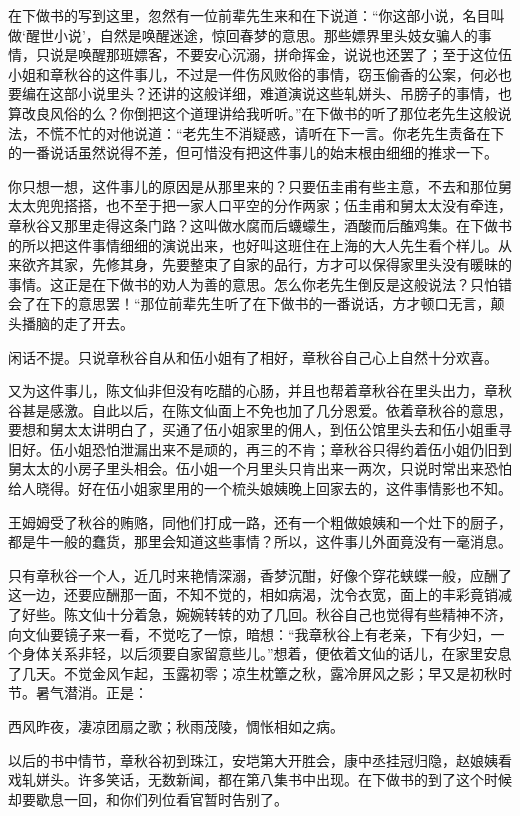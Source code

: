 \documentclass[12pt,UTF8]{ctexbook}
\begin{document}
{{{在下做书的写到这里，忽然有一位前辈先生来和在下说道：“你这部小说，名目叫做‘醒世小说’，自然是唤醒迷途，惊回春梦的意思。那些嫖界里头妓女骗人的事情，只说是唤醒那班嫖客，不要安心沉溺，拼命挥金，说说也还罢了；至于这位伍小姐和章秋谷的这件事儿，不过是一件伤风败俗的事情，窃玉偷香的公案，何必也要编在这部小说里头？还讲的这般详细，难道演说这些轧姘头、吊膀子的事情，也算改良风俗的么？你倒把这个道理讲给我听听。”在下做书的听了那位老先生这般说法，不慌不忙的对他说道：“老先生不消疑惑，请听在下一言。你老先生责备在下的一番说话虽然说得不差，但可惜没有把这件事儿的始末根由细细的推求一下。

你只想一想，这件事儿的原因是从那里来的？只要伍圭甫有些主意，不去和那位舅太太兜兜搭搭，也不至于把一家人口平空的分作两家；伍圭甫和舅太太没有牵连，章秋谷又那里走得这条门路？这叫做水腐而后蠛蠓生，酒酸而后醢鸡集。在下做书的所以把这件事情细细的演说出来，也好叫这班住在上海的大人先生看个样儿。从来欲齐其家，先修其身，先要整束了自家的品行，方才可以保得家里头没有暖昧的事情。这正是在下做书的劝人为善的意思。怎么你老先生倒反是这般说法？只怕错会了在下的意思罢！“那位前辈先生听了在下做书的一番说话，方才顿口无言，颠头播脑的走了开去。

闲话不提。只说章秋谷自从和伍小姐有了相好，章秋谷自己心上自然十分欢喜。

又为这件事儿，陈文仙非但没有吃醋的心肠，并且也帮着章秋谷在里头出力，章秋谷甚是感激。自此以后，在陈文仙面上不免也加了几分恩爱。依着章秋谷的意思，要想和舅太太讲明白了，买通了伍小姐家里的佣人，到伍公馆里头去和伍小姐重寻旧好。伍小姐恐怕泄漏出来不是顽的，再三的不肯；章秋谷只得约着伍小姐仍旧到舅太太的小房子里头相会。伍小姐一个月里头只肯出来一两次，只说时常出来恐怕给人晓得。好在伍小姐家里用的一个梳头娘姨晚上回家去的，这件事情影也不知。

王姆姆受了秋谷的贿赂，同他们打成一路，还有一个粗做娘姨和一个灶下的厨子，都是牛一般的蠢货，那里会知道这些事情？所以，这件事儿外面竟没有一毫消息。

只有章秋谷一个人，近几时来艳情深溺，香梦沉酣，好像个穿花蛱蝶一般，应酬了这一边，还要应酬那一面，不知不觉的，相如病渴，沈令衣宽，面上的丰彩竟销减了好些。陈文仙十分着急，婉婉转转的劝了几回。秋谷自己也觉得有些精神不济，向文仙要镜子来一看，不觉吃了一惊，暗想：“我章秋谷上有老亲，下有少妇，一个身体关系非轻，以后须要自家留意些儿。”想着，便依着文仙的话儿，在家里安息了几天。不觉金风乍起，玉露初零；凉生枕簟之秋，露冷屏风之影；早又是初秋时节。暑气潜消。正是：

西风昨夜，凄凉团扇之歌；秋雨茂陵，惆怅相如之病。

以后的书中情节，章秋谷初到珠江，安垲第大开胜会，康中丞挂冠归隐，赵娘姨看戏轧姘头。许多笑话，无数新闻，都在第八集书中出现。在下做书的到了这个时候却要歇息一回，和你们列位看官暂时告别了。





}}}
\end{document}
